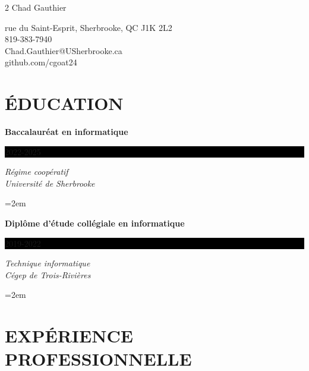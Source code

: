 \documentclass[paper=a4,fontsize=11pt]{scrartcl}
\newcommand{\sepspace}{\vspace*{1em}}
\newcommand{\NewPart}[1]{\section*{\uppercase{#1}}}
\newcommand{\EducationEntry}[4]{
	\noindent \textbf{#1} \hfill      %
	\colorbox{Black}{%
		\parbox{12em}{\hfill\color{White}#2}} %
	\par  %
	\noindent \textit{#3} \par        %
	\noindent\hangindent=2em\hangafter=0 \small #4 %
	\normalsize \par}
\begin{document}
\sepspace
\begin{multicols}{2}
	\huge {}Chad Gauthier\par \normalsize \normalfont
	\columnbreak
	 rue du Saint-Esprit, Sherbrooke, QC J1K 2L2\\
	819-383-7940\\
	Chad.Gauthier@USherbrooke.ca\\
	github.com/cgoat24
\end{multicols}

\NewPart{Éducation}

\EducationEntry{Baccalauréat en informatique}{2022-2025}{Régime coopératif\\Université de Sherbrooke}
\sepspace
\EducationEntry{Diplôme d'étude collégiale en informatique}{2019-2022}{Technique informatique\\Cégep de Trois-Rivières}
\sepspace

\NewPart{Expérience professionnelle}
\end{document}
